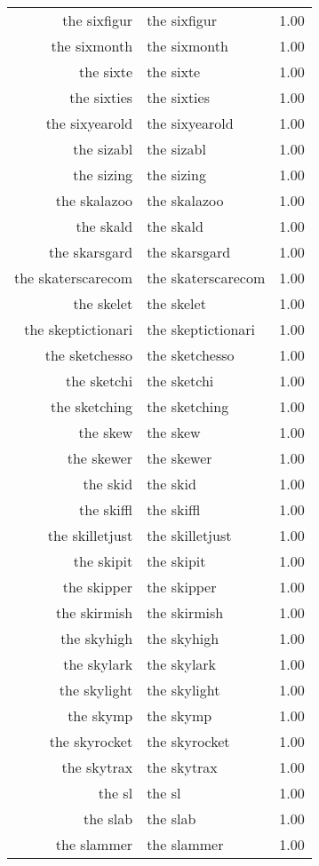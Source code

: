 \begin{table}[ht]
\begin{tabular}{rlr}
  the sixfigur & the sixfigur & 1.00 \\ 
  the sixmonth & the sixmonth & 1.00 \\ 
  the sixte & the sixte & 1.00 \\ 
  the sixties & the sixties & 1.00 \\ 
  the sixyearold & the sixyearold & 1.00 \\ 
  the sizabl & the sizabl & 1.00 \\ 
  the sizing & the sizing & 1.00 \\ 
  the skalazoo & the skalazoo & 1.00 \\ 
  the skald & the skald & 1.00 \\ 
  the skarsgard & the skarsgard & 1.00 \\ 
  the skaterscarecom & the skaterscarecom & 1.00 \\ 
  the skelet & the skelet & 1.00 \\ 
  the skeptictionari & the skeptictionari & 1.00 \\ 
  the sketchesso & the sketchesso & 1.00 \\ 
  the sketchi & the sketchi & 1.00 \\ 
  the sketching & the sketching & 1.00 \\ 
  the skew & the skew & 1.00 \\ 
  the skewer & the skewer & 1.00 \\ 
  the skid & the skid & 1.00 \\ 
  the skiffl & the skiffl & 1.00 \\ 
  the skilletjust & the skilletjust & 1.00 \\ 
  the skipit & the skipit & 1.00 \\ 
  the skipper & the skipper & 1.00 \\ 
  the skirmish & the skirmish & 1.00 \\ 
  the skyhigh & the skyhigh & 1.00 \\ 
  the skylark & the skylark & 1.00 \\ 
  the skylight & the skylight & 1.00 \\ 
  the skymp & the skymp & 1.00 \\ 
  the skyrocket & the skyrocket & 1.00 \\ 
  the skytrax & the skytrax & 1.00 \\ 
  the sl & the sl & 1.00 \\ 
  the slab & the slab & 1.00 \\ 
  the slammer & the slammer & 1.00 \\ 

\end{tabular}
\end{table}
